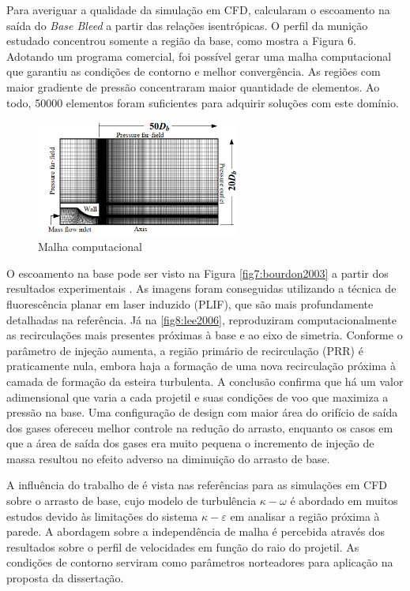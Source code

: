 Para averiguar a qualidade da simulação em CFD, \cite{Lee2006Sep} calcularam o escoamento na saída do \textit{Base Bleed} a partir das relações isentrópicas. O perfil da munição estudado concentrou somente a região da base, como mostra a Figura 6. Adotando um programa comercial, foi possível gerar uma malha computacional que garantiu as condições de contorno e melhor convergência. As regiões com maior gradiente de pressão concentraram maior quantidade de elementos. Ao todo, \num{50000} elementos foram suficientes para adquirir soluções com este domínio.

\begin{figure}[!ht]
	\centering
	\includegraphics[width=0.6\textwidth]{foto06-malha-lee&kim.png}
	\caption[Malha computacional]{Malha computacional \cite{Lee2006Sep}}
	\label{fig6:lee2006}
\end{figure}
	
O escoamento na base pode ser visto na Figura \ref{fig7:bourdon2003} a partir dos resultados experimentais \cite{Bourdon2003Feb}. As imagens foram conseguidas utilizando a técnica de fluorescência planar em laser induzido (PLIF), que são mais profundamente detalhadas na referência. Já na \autoref{fig8:lee2006}, \cite{Lee2006Sep} reproduziram computacionalmente as recirculações mais presentes próximas à base e ao eixo de simetria. Conforme o parâmetro de injeção aumenta, a região primário de recirculação (PRR) é praticamente nula, embora haja a formação de uma nova recirculação próxima à camada de formação da esteira turbulenta. A conclusão confirma que há um valor adimensional que varia a cada projetil e suas condições de voo que maximiza a pressão na base. Uma configuração de design com maior área do orifício de saída dos gases ofereceu melhor controle na redução do arrasto, enquanto os casos em que a área de saída dos gases era muito pequena o incremento de injeção de massa resultou no efeito adverso na diminuição do arrasto de base. 

A influência do trabalho de \cite{Lee2006Sep} é vista nas referências para as simulações em CFD sobre o arrasto de base, cujo modelo de turbulência \(\kappa-\omega\) é abordado em muitos estudos devido às limitações do sistema \(\kappa-\varepsilon\) em analisar a região próxima à parede. A abordagem sobre a independência de malha é percebida através dos resultados sobre o perfil de velocidades em função do raio do projetil. As condições de contorno serviram como parâmetros norteadores para aplicação na proposta da dissertação.

